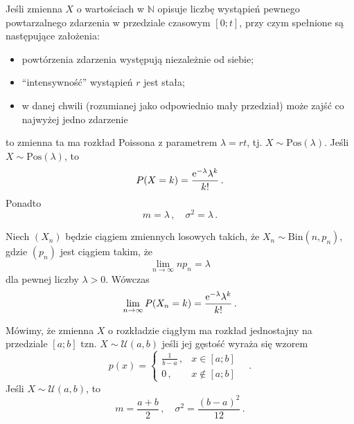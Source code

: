 \documentclass{myclass}
\numberwithin{equation}{subsection}
\begin{document}
\begin{definition}
Jeśli zmienna \(X\) o wartościach w \(\mathbb{N}\) opisuje liczbę wystąpień pewnego powtarzalnego
zdarzenia w przedziale czasowym \([0;t]\), przy czym spełnione są następujące założenia:
\begin{itemize}

    \item powtórzenia zdarzenia występują niezależnie od siebie;
    
    \item \enquote{intensywność} wystąpień \(r\) jest stała;

    \item w danej chwili (rozumianej jako odpowiednio mały przedział) może zajść co najwyżej jedno
    zdarzenie

\end{itemize}

to zmienna ta ma rozkład Poissona z parametrem \(\lambda = rt\), tj. \(X \sim
\mathrm{Pos}(\lambda)\). Jeśli \(X \sim \mathrm{Pos}(\lambda)\), to
\begin{equation*}
    P(X = k) = \frac{\mathrm{e}^{-\lambda} \lambda^k}{k!}\,.
\end{equation*}
Ponadto
\begin{equation*}
    m = \lambda\,,\quad \sigma^2 = \lambda\,.
\end{equation*}
\end{definition}

\begin{theorem}[Poissona]
Niech \((X_n)\) będzie ciągiem zmiennych losowych takich, że \(X_n \sim \mathrm{Bin}(n, p_n)\), gdzie
\((p_n)\) jest ciągiem takim, że
\begin{equation*}
    \lim_{n \to \infty} n p_n = \lambda
\end{equation*}
dla pewnej liczby \(\lambda > 0\). Wówczas
\begin{equation*}
    \lim_{n \to \infty} P(X_n = k) = \frac{\mathrm{e}^{-\lambda} \lambda^k}{k!}\,.
\end{equation*}
\end{theorem}

\begin{definition}
Mówimy, że zmienna \(X\) o rozkładzie ciągłym ma rozkład jednostajny na przedziale \([a;b]\) tzn.
\(X \sim \mathcal{U}(a,b)\) jeśli jej gęstość wyraża się wzorem
\begin{equation*}
    p(x) = \begin{cases}
        \frac{1}{b - a}\,, &x\in[a;b]\\
        0\,,&x\notin[a;b]
    \end{cases}\quad.
\end{equation*}
Jeśli \(X \sim \mathcal{U}(a,b)\), to
\begin{equation*}
    m = \frac{a+b}{2}\,,\quad \sigma^2 = \frac{(b-a)^2}{12}\,.
\end{equation*}
\end{definition}
\end{document}
